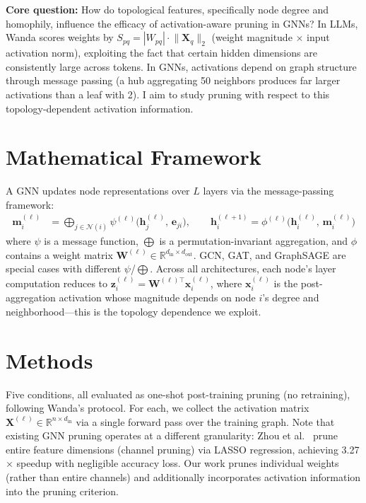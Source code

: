 \documentclass[10pt]{article}
\begin{document}
\textbf{Core question:} How do topological features, specifically node degree and homophily, influence the efficacy of activation-aware pruning in GNNs? In LLMs, Wanda scores weights by $S_{pq} = |W_{pq}| \cdot \lVert \mathbf{X}_q \rVert_2$ (weight magnitude $\times$ input activation norm), exploiting the fact that certain hidden dimensions are consistently large across tokens. In GNNs, activations depend on graph structure through message passing (a hub aggregating 50 neighbors produces far larger activations than a leaf with 2). I aim to study pruning with respect to this topology-dependent activation information.

\section{Mathematical Framework}

A GNN updates node representations over $L$ layers via the message-passing framework:
\begin{align}
    \mathbf{m}_i^{(\ell)} &= \bigoplus\nolimits_{j \in \mathcal{N}(i)} \psi^{(\ell)}\!\bigl(\mathbf{h}_j^{(\ell)},\, \mathbf{e}_{ji}\bigr), \qquad
    \mathbf{h}_i^{(\ell+1)} = \phi^{(\ell)}\!\bigl(\mathbf{h}_i^{(\ell)},\, \mathbf{m}_i^{(\ell)}\bigr) \tag{1}
\end{align}
where $\psi$ is a message function, $\bigoplus$ is a permutation-invariant aggregation, and $\phi$ contains a weight matrix $\mathbf{W}^{(\ell)} \in \mathbb{R}^{d_{\text{in}} \times d_{\text{out}}}$. GCN, GAT, and GraphSAGE are special cases with different $\psi$/$\bigoplus$. Across all architectures, each node's layer computation reduces to $\mathbf{z}_i^{(\ell)} = \mathbf{W}^{(\ell)\top}\! \mathbf{x}_i^{(\ell)}$, where $\mathbf{x}_i^{(\ell)}$ is the post-aggregation activation whose magnitude depends on node $i$'s degree and neighborhood---this is the topology dependence we exploit.

\section{Methods}

Five conditions, all evaluated as one-shot post-training pruning (no retraining), following Wanda's protocol. For each, we collect the activation matrix $\mathbf{X}^{(\ell)} \in \mathbb{R}^{n \times d_{\text{in}}}$ via a single forward pass over the training graph. Note that existing GNN pruning operates at a different granularity: Zhou et al.~\cite{zhou2021} prune entire feature dimensions (channel pruning) via LASSO regression, achieving 3.27$\times$ speedup with negligible accuracy loss. Our work prunes individual weights (rather than entire channels) and additionally incorporates activation information into the pruning criterion.
\end{document}
